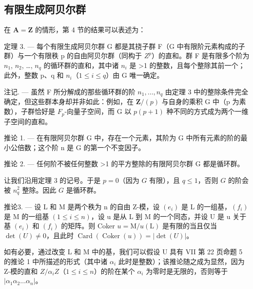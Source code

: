 \subsection{有限生成阿贝尔群}

在 \(\mathbf{A} = \mathbf{Z}\) 的情形，第 4 节的结果可以表述为：

定理 3. --- 每个有限生成阿贝尔群 G 都是其挠子群 F（G 中有限阶元素构成的子群）与一个有限秩 p 的自由阿贝尔群（同构于 \(Z^{p}\)）的直和。群 F 是有限多个阶为 \(n_{1}\), \(n_{2}\), \ldots, \(n_{q}\) 的循环群的直和，其中诸 \(n_{i}\) 是 \textgreater1 的整数，且每个整除其前一个；此外，整数 p、q 和 \(n_{i}\)（\(1 \leq i \leq q\)）由 G 唯一确定。

注记. --- 虽然 F 所分解成的那些循环群的阶 \(n_{1}, \ldots, n_{q}\) 由定理 3 中的整除条件完全确定，但这些群本身却并非如此：例如，在 \(\mathbf{Z}/(p)\) 与自身的乘积 G 中（p 为素数），子群恰好是 \(F_{p}\)-向量子空间，而 G 以 \(p(p+1)\) 种不同的方式成为两个一维子空间的直和。

推论 1. --- 在有限阿贝尔群 G 中，存在一个元素，其阶为 G 中所有元素的阶的最小公倍数；这个阶 n 是 G 的第一个不变因子。

推论 2. --- 任何阶不被任何整数 \textgreater1 的平方整除的有限阿贝尔群 G 都是循环群。

让我们沿用定理 3 的记号。于是 \(p = 0\)（因为 \(G\) 有限），且 \(q \leqslant 1\)，否则 \(G\) 的阶会被 \(n_q^2\) 整除。因此 \(G\) 是循环群。

推论3. --- 设 L 和 M 是两个秩为 n 的自由 Z-模，设 \((e_{i})\) 是 L 的一组基，\((f_{i})\) 是 M 的一组基 \((1 \leqslant i \leqslant n)\)，设 u 是从 L 到 M 的一个同态，并设 U 是 u 关于基 \((e_{i})\) 和 \((f_{i})\) 的矩阵。则 Coker \(u = \mathrm{M}/u(\mathrm{L})\) 是有限的当且仅当 \(\det(U) \neq 0\)，且此时 \(\operatorname{Card}(\operatorname{Coker}(u)) = |\det(U)|\)。

如有必要，通过改变 L 和 M 中的基，我们可以假设 U 具有 VII 第 22 页命题 5 的推论 1 中所描述的形式（其中诸 \(\alpha_{i}\) 此时是整数）；该推论随之成为显然，因为 Z-模的直和 \(Z/\alpha_{i}Z\)（\(1 \leqslant i \leqslant n\)）的阶在某个 \(\alpha_{i}\) 为零时是无限的，否则等于 \(|\alpha_{1}\alpha_{2} \ldots \alpha_{n}|\)。

